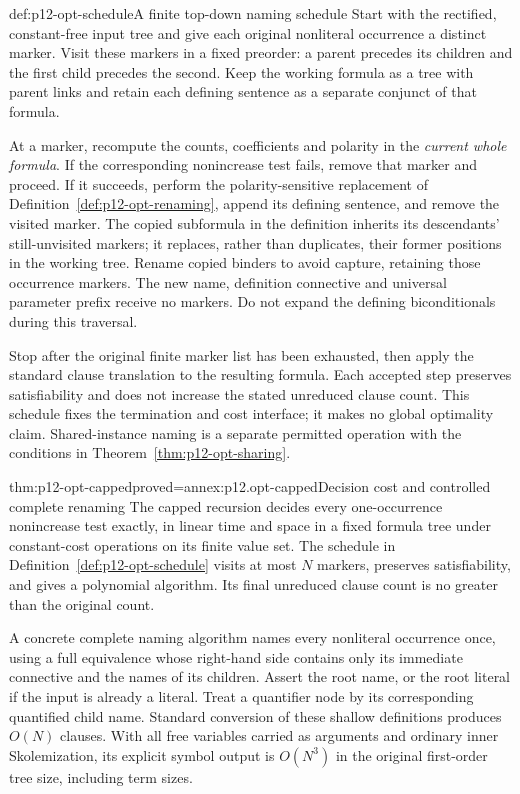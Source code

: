 \begin{hbmethod}{def:p12-opt-schedule}{A finite top-down naming schedule}
Start with the rectified, constant-free input tree and give each original
nonliteral occurrence a distinct marker. Visit these markers in a fixed
preorder: a parent precedes its children and the first child precedes the
second. Keep the working formula as a tree with parent links and retain
each defining sentence as a separate conjunct of that formula.

At a marker, recompute the counts, coefficients and polarity in the
\emph{current whole formula}. If the corresponding nonincrease test
fails, remove that marker and proceed. If it succeeds, perform the
polarity-sensitive replacement of
Definition~\ref{def:p12-opt-renaming}, append its defining sentence,
and remove the visited marker. The copied subformula in the definition
inherits its descendants' still-unvisited markers; it replaces, rather
than duplicates, their former positions in the working tree. Rename
copied binders to avoid capture, retaining those occurrence markers.
The new name, definition connective and universal parameter prefix
receive no markers. Do not expand the defining biconditionals during
this traversal.

Stop after the original finite marker list has been exhausted, then
apply the standard clause translation to the resulting formula.
Each accepted step preserves satisfiability and does not increase the
stated unreduced clause count. This schedule fixes the termination and
cost interface; it makes no global optimality claim. Shared-instance
naming is a separate permitted operation with the conditions in
Theorem~\ref{thm:p12-opt-sharing}.
\end{hbmethod}

\begin{hbtheorem}{thm:p12-opt-capped}{proved=annex:p12.opt-capped}{Decision cost and controlled complete renaming}
The capped recursion decides every one-occurrence nonincrease test
exactly, in linear time and space in a fixed formula tree under
constant-cost operations on its finite value set.
The schedule in Definition~\ref{def:p12-opt-schedule} visits at most
\(N\) markers, preserves satisfiability, and gives a polynomial
algorithm. Its final unreduced clause count is no greater than the
original count.

A concrete complete naming algorithm names every nonliteral
occurrence once, using a full equivalence whose right-hand side
contains only its immediate connective and the names of its children.
Assert the root name, or the root literal if the input is already a
literal. Treat a quantifier node by its corresponding
quantified child name. Standard conversion of these shallow definitions
produces \(O(N)\) clauses. With all free variables carried as arguments
and ordinary inner Skolemization, its explicit symbol output is
\(O(N^3)\) in the original first-order tree size, including term sizes.
\end{hbtheorem}

